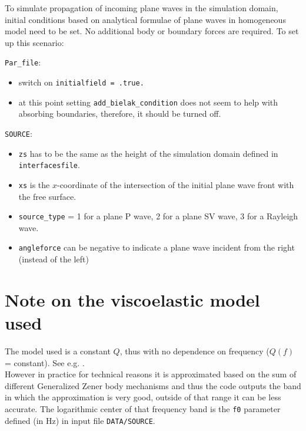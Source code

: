 To simulate propagation of incoming plane waves in the simulation domain, initial conditions based on analytical formulae of plane waves in homogeneous model need to be set. No additional body or boundary forces are required. To set up this scenario:
%
\begin{description}
\item{\verb+Par_file+:}
  \begin{itemize}
  \item switch on \verb+initialfield = .true. +
  \item at this point setting \verb+add_bielak_condition+ does not seem to help with absorbing boundaries, therefore, it should be turned off.
  \end{itemize}
\item{\verb+SOURCE+:}
  \begin{itemize}
  \item \verb+zs+ has to be the same as the height of the simulation domain defined in \verb+interfacesfile+.
  \item \verb+xs+ is the $x$-coordinate of the intersection of the initial plane wave front with the free surface.
  \item \verb+source_type+ = 1 for a plane P wave, 2 for a plane SV wave, 3 for a Rayleigh wave.
  \item \verb+angleforce+ can be negative to indicate a plane wave incident from the right (instead of the left)
  \end{itemize}
\end{description}

\section{Note on the viscoelastic model used}

\noindent
The model used is a constant $Q$, thus with no dependence on frequency ($Q(f)$ = constant).
See e.g. \cite{BlKoChLoXi16}. \\

\noindent
However in practice for technical reasons it is approximated based on the sum of different Generalized Zener body mechanisms
and thus the code outputs the band in which the approximation is very good, outside of that range it can be less accurate.
The logarithmic center of that frequency band is the \texttt{f0} parameter defined (in Hz) in input file \texttt{DATA/SOURCE}.

